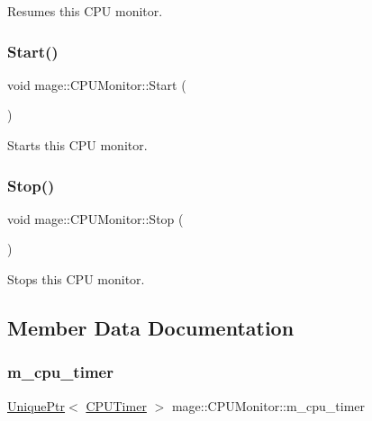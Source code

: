 Resumes this C\+PU monitor. \hypertarget{classmage_1_1_c_p_u_monitor_a3f88acbb979f47309fd46f1b507fed09}{}\label{classmage_1_1_c_p_u_monitor_a3f88acbb979f47309fd46f1b507fed09} 
\subsubsection{\texorpdfstring{Start()}{Start()}}
{\footnotesize\ttfamily void mage\+::\+C\+P\+U\+Monitor\+::\+Start (\begin{DoxyParamCaption}{ }\end{DoxyParamCaption})\hspace{0.3cm}{\ttfamily [noexcept]}}

Starts this C\+PU monitor. \hypertarget{classmage_1_1_c_p_u_monitor_a133aaed1df0e84486a6fc748d66615bb}{}\label{classmage_1_1_c_p_u_monitor_a133aaed1df0e84486a6fc748d66615bb} 
\subsubsection{\texorpdfstring{Stop()}{Stop()}}
{\footnotesize\ttfamily void mage\+::\+C\+P\+U\+Monitor\+::\+Stop (\begin{DoxyParamCaption}{ }\end{DoxyParamCaption})\hspace{0.3cm}{\ttfamily [noexcept]}}

Stops this C\+PU monitor. 

\subsection{Member Data Documentation}
\hypertarget{classmage_1_1_c_p_u_monitor_a925f9d2366d798f2dba783a3ab25f651}{}\label{classmage_1_1_c_p_u_monitor_a925f9d2366d798f2dba783a3ab25f651} 
\subsubsection{\texorpdfstring{m\+\_\+cpu\+\_\+timer}{m\_cpu\_timer}}
{\footnotesize\ttfamily \hyperlink{namespacemage_a3316d7143a973e37adf1110f2e80ca31}{Unique\+Ptr}$<$ \hyperlink{classmage_1_1_c_p_u_timer}{C\+P\+U\+Timer} $>$ mage\+::\+C\+P\+U\+Monitor\+::m\+\_\+cpu\+\_\+timer\hspace{0.3cm}{\ttfamily [private]}}

